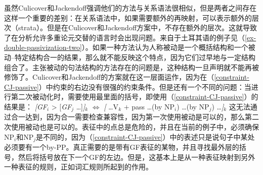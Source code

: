 \begin{exe}
\begin{xlist}[iv.]
\begin{exe}
\begin{xlist}[iv.]
虽然Culicover和Jackendoff强调他们的方法与关系语法\citep{Perlmutter83a-ed}很相似，但是两者之间存在这样一个重要的差别：在关系语法中，如果需要额外的再映射，可以表示额外的层次（strata）。但是在Culicover和Jackendoff方案中，不存在额外的层次。这就导致了在分析允许多重论元交替的语言时会出现问题。来自于土耳其语的例子见（\ref{ex-double-passivization-two}）。如果一种方法认为人称被动是一个概括结构和一个被动--特定结构合一的结果，那么就不能反映这个特点，因为它们过早地与一定结构组合了。主张被动的句法结构的方法存在的问题是，这种结构一旦声明就不能再被修饰了。Culicover和Jackendoff的方案就在这一层面运作，因为在（\ref{constraint-CJ-passive}）中约束的右边没有很强的约束条件。但是还有一个不同的问题：当进行第二次被动化时，需要使用最里面的括号，即使用（\ref{constraint-CJ-passive}）的结果是：
\ea
{}\emph{[GF}$_i$ > [\emph{GF}$_j$ \ldots]\emph{]}$_k$ $\Leftrightarrow$ \emph{[} \ldots V$_k$ $+$ pass \ldots (by NP$_i$) \ldots (by NP$_j$) \ldots\emph{]}$_k$
\z
这无法通过合一达到，因为合一需要检查兼容性，因为第一次使用被动是可以的，那么第二次使用被动也是可以的。表征中的点总是危险的，并且在当前的例子中，必须确保NP$_i$和NP$_j$是不同的，因为（\ref{constraint-CJ-passive}）中的表述只是说句子中某处必须要有一个by-PP。真正需要的是带有GF表征的某物，并且寻找最外层的括号，然后将括号放在下一个GF的左边。但是，这基本上是从一种表征映射到另外一种表征的规则，正如词汇规则所起到的作用。

\end{xlist}
\end{exe}
\end{xlist}
\end{exe}
